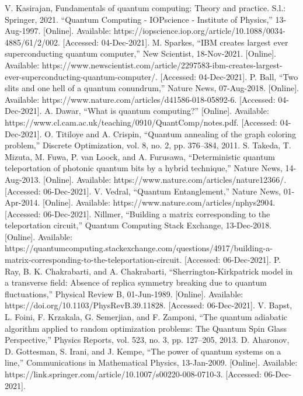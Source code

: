 \documentclass[conference]{IEEEtran}
\begin{document}
\begin{thebibliography}{00}
 V. Kasirajan, Fundamentals of quantum computing: Theory and practice. S.l.: Springer, 2021.
 “Quantum Computing - IOPscience - Institute of Physics,” 13-Aug-1997. [Online]. Available: https://iopscience.iop.org/article/10.1088/0034-4885/61/2/002. [Accessed: 04-Dec-2021]. 
 M. Sparkes, “IBM creates largest ever superconducting quantum computer,” New Scientist, 18-Nov-2021. [Online]. Available: https://www.newscientist.com/article/2297583-ibm-creates-largest-ever-superconducting-quantum-computer/. [Accessed: 04-Dec-2021]. 
 P. Ball, “Two slits and one hell of a quantum conundrum,” Nature News, 07-Aug-2018. [Online]. Available: https://www.nature.com/articles/d41586-018-05892-6. [Accessed: 04-Dec-2021].
 A. Dawar, “What is quantum computing?” [Online]. Available: https://www.cl.cam.ac.uk/teaching/0910/QuantComp/notes.pdf. [Accessed: 04-Dec-2021].
 O. Titiloye and A. Crispin, “Quantum annealing of the graph coloring problem,” Discrete Optimization, vol. 8, no. 2, pp. 376–384, 2011. 
 S. Takeda, T. Mizuta, M. Fuwa, P. van Loock, and A. Furusawa, “Deterministic quantum teleportation of photonic quantum bits by a hybrid technique,” Nature News, 14-Aug-2013. [Online]. Available: https://www.nature.com/articles/nature12366/. [Accessed: 06-Dec-2021]. 
 V. Vedral, “Quantum Entanglement,” Nature News, 01-Apr-2014. [Online]. Available: https://www.nature.com/articles/nphys2904. [Accessed: 06-Dec-2021]. 
 Nillmer, “Building a matrix corresponding to the teleportation circuit,” Quantum Computing Stack Exchange, 13-Dec-2018. [Online]. Available: https://quantumcomputing.stackexchange.com/questions/4917/building-a-matrix-corresponding-to-the-teleportation-circuit. [Accessed: 06-Dec-2021].
 P. Ray, B. K. Chakrabarti, and A. Chakrabarti, “Sherrington-Kirkpatrick model in a transverse field: Absence of replica symmetry breaking due to quantum fluctuations,” Physical Review B, 01-Jun-1989. [Online]. Available: https://doi.org/10.1103/PhysRevB.39.11828. [Accessed: 06-Dec-2021]. 
 V. Bapst, L. Foini, F. Krzakala, G. Semerjian, and F. Zamponi, “The quantum adiabatic algorithm applied to random optimization problems: The Quantum Spin Glass Perspective,” Physics Reports, vol. 523, no. 3, pp. 127–205, 2013.
 D. Aharonov, D. Gottesman, S. Irani, and J. Kempe, “The power of quantum systems on a line,” Communications in Mathematical Physics, 13-Jan-2009. [Online]. Available: https://link.springer.com/article/10.1007/s00220-008-0710-3. [Accessed: 06-Dec-2021]. 

\end{thebibliography}
\end{document}
